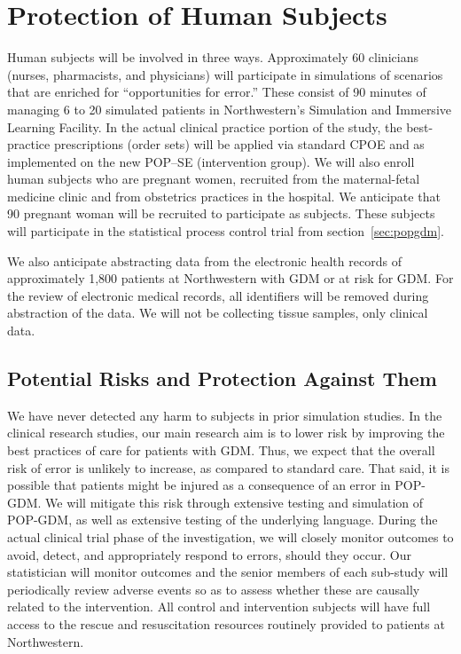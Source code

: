 \section{Protection of Human Subjects}

Human subjects will be involved in three ways. Approximately 60 clinicians (nurses, pharmacists, and physicians) will participate
in simulations of scenarios that are enriched for “opportunities for error.” These consist of 90 minutes of managing 6 to 20 simulated patients
in Northwestern’s Simulation and Immersive Learning Facility. In the actual clinical practice portion of the study, the best-practice prescriptions (order sets) 
will be applied via standard CPOE and as implemented on the new POP–SE (intervention group). We will also enroll  human subjects who are pregnant women, recruited
from the maternal-fetal medicine clinic and from obstetrics practices
in the hospital. We anticipate that 90 pregnant woman will be
recruited to participate as subjects. These subjects will participate
in the statistical process control trial from
section~\ref{sec:popgdm}.

We also anticipate abstracting data from the electronic health records
of approximately 1,800 patients at Northwestern with GDM or at risk
for GDM.  For the review of electronic medical records, all
identifiers will be removed during abstraction of the data.  We will
not be collecting tissue samples, only clinical data.

\subsection{Potential Risks and Protection Against Them}

We have never detected any harm to
subjects in prior simulation studies. In the clinical research studies, our main research aim is to lower risk by improving
the best practices of care for patients with GDM. Thus, we expect that the overall risk of error is unlikely to increase, as compared to
standard care.  That said, it is possible
that patients might be injured as a consequence of an error in
POP-GDM.  We will mitigate this risk through extensive testing and
simulation of POP-GDM, as well as extensive testing of the underlying
\poppl{} language.  During the actual clinical trial phase of the
investigation, we will closely monitor outcomes to avoid, detect, and
appropriately respond to errors, should they occur. Our statistician will monitor outcomes and the senior
members of each sub-study will periodically review adverse events so as
to assess whether these are causally related to the intervention. All
control and intervention subjects will have full access to the rescue
and resuscitation resources routinely provided to patients at
Northwestern.

